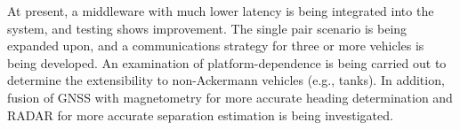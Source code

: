 \documentclass[twocolumn,10pt]{article}
\begin{document}
  At present, a middleware with much lower latency is being integrated into the system, and testing shows improvement.  The single pair scenario is being expanded upon, and a communications strategy for three or more vehicles is being developed.  An examination of platform-dependence is being carried out to determine the extensibility to non-Ackermann vehicles (e.g., tanks). In addition, fusion of GNSS with magnetometry for more accurate heading determination and RADAR for more accurate separation estimation is being investigated.



\nocite{CofieldUGThesis}

\end{document}
